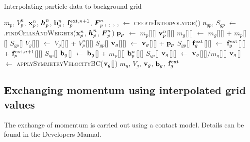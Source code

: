 \begin{breakablealgorithm}
  \caption{Interpolating particle data to background grid}
  \begin{algorithmic}[1]
    \Require $m_p$, $V_p^n$, $\mathbf{x}_p^n$, $\boldsymbol{h}_p^n$, $\mathbf{b}_p^n$, $\mathbf{f}^{\text{ext},n+1}_p$, $\boldsymbol{F}_p^n$,
             , , 
             , 
      \State {} $\leftarrow$ \textsc{createInterpolator}()
          \State $n_{gp}$, $S_{gp}$ $\leftarrow$ 
            .\textsc{findCellsAndWeights}($\mathbf{x}_p^n$, $\boldsymbol{h}_p^n$, $\boldsymbol{F}_p^n$)
          \State $\mathbf{p}_p$ $\leftarrow$ $m_p$[\TTmatl][\TTpart] $\mathbf{v}_p^n$[\TTmatl][\TTpart] 
            \State $m_g$[\TTmatl][\TTnode] $\leftarrow$ $m_g$[\TTmatl][\TTnode] + $m_p$[\TTmatl][\TTpart] $S_{gp}$[\TTnode]
            \State $V_g$[\TTmatl][\TTnode] $\leftarrow$ $V_g$[\TTmatl][\TTnode] + $V_p^n$[\TTmatl][\TTpart] $S_{gp}$[\TTnode]
            \State $\mathbf{v}_g$[\TTmatl][\TTnode] $\leftarrow$ $\mathbf{v}_g$[\TTmatl][\TTnode] + $\mathbf{p}_p$ $S_{gp}$[\TTnode]
            \State $\mathbf{f}^{\text{ext}}_g$[\TTmatl][\TTnode] $\leftarrow$ $\mathbf{f}^{\text{ext}}_g$[\TTmatl][\TTnode] + $\mathbf{f}^{\text{ext},n+1}_p$[\TTmatl][\TTpart] $S_{gp}$[\TTnode]
            \State $\mathbf{b}_g$[\TTnode] $\leftarrow$ $\mathbf{b}_g$[\TTnode] + $m_p$[\TTmatl][\TTpart] $\mathbf{b}^n_p$[\TTmatl][\TTpart] $S_{gp}$[\TTnode]
          \EndFor
        \EndFor
          \State $\mathbf{v}_g$[\TTmatl][\TTnode] $\leftarrow$ $\mathbf{v}_g$[\TTmatl][\TTnode]/$m_g$[\TTmatl][\TTnode]
        \EndFor
        \State $\mathbf{v}_g$[\TTmatl] $\leftarrow$ \textsc{applySymmetryVelocityBC}($\mathbf{v}_g$[\TTmatl])
      \EndFor
      \State \Return $m_g$, $V_g$, $\mathbf{v}_g$, $\mathbf{b}_g$, $\mathbf{f}_g^{\text{ext}}$
    \EndProcedure
  \end{algorithmic}
\end{breakablealgorithm}

\subsection{Exchanging momentum using interpolated grid values}
The exchange of momentum is carried out using a contact model.  Details can be found in the
\Vaango Developers Manual.

